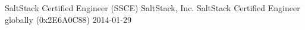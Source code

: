 \awarditem
{SaltStack Certified Engineer (SSCE)}
{SaltStack, Inc.}
{ SaltStack Certified Engineer globally (0x2E6A0C88)}%
{2014-01-29}